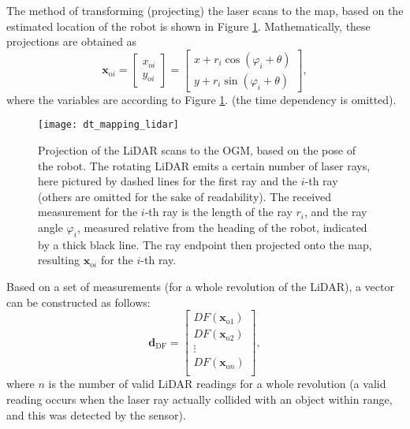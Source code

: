 The method of transforming (projecting) the laser scans to the map, based on the estimated
location of the robot is shown in Figure \ref{fig:ogm-laser-projection}.
Mathematically, these projections are obtained as
\begin{equation}\label{eq:ray-projection}
    \mathbf{x}_{\mathrm{o}i} = \begin{bmatrix}x_{\mathrm{o}i}\\y_{\mathrm{o}i}\end{bmatrix}
    = \begin{bmatrix}x + r_i\cos(\varphi_i + \theta)\\y + r_i\sin(\varphi_i + \theta)\end{bmatrix},
\end{equation}
where the variables are according to Figure \ref{fig:ogm-laser-projection}. (the time dependency is omitted).
\begin{figure}[htbp]
    \centering
    \texttt{[image: dt\_mapping\_lidar]}
    \caption{Projection of the LiDAR scans to the OGM, based on the pose of the robot.
    The rotating LiDAR emits a certain number of laser rays,
    here pictured by dashed lines for the first ray and the $i$-th ray
    (others are omitted for the sake of readability).
    The received measurement for the $i$-th ray is the length of the ray $r_i$,
    and the ray angle $\varphi_i$, measured relative from the heading of the robot,
    indicated by a thick black line.
    The ray endpoint then projected onto the map, resulting $\mathbf{x}_{\text{o}i}$ for the $i$-th ray.}
    \label{fig:ogm-laser-projection}
\end{figure}

Based on a set of measurements (for a whole revolution of the LiDAR), a vector can be constructed as follows:
\begin{equation}\label{eq:df-vector}
    \mathbf{d}_{\text{DF}} =
    \begin{bmatrix}
        DF(\mathbf{x}_{\text{o}1}) \\
        DF(\mathbf{x}_{\text{o}2}) \\
        \vdots                     \\
        DF(\mathbf{x}_{\text{o}n}) \\
    \end{bmatrix},
\end{equation}
where $n$ is the number of valid LiDAR readings for a whole revolution
(a valid reading occurs when the laser ray actually collided with an object within range, and this was
detected by the sensor).

